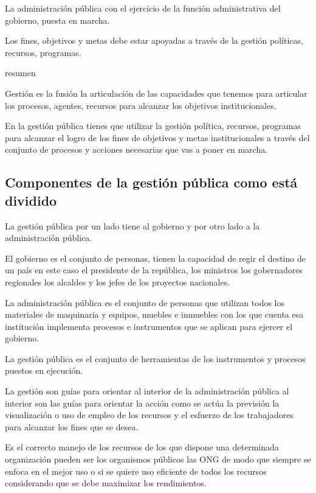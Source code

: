 \documentclass[
  letterpaper,
  DIV=11,
  numbers=noendperiod]{scrartcl}
\begin{document}
La administración pública con el ejercicio de la función administrativa
del gobierno, puesta en marcha.

Los fines, objetivos y metas debe estar apoyadas a través de la gestión
políticas, recursos, programas.

resumen

Gestión es la fusión la articulación de las capacidades que tenemos para
articular los procesos, agentes, recursos para alcanzar los objetivos
institucionales.

En la gestión pública tienes que utilizar la gestión política, recursos,
programas para alcanzar el logro de los fines de objetivos y metas
institucionales a través del conjunto de procesos y acciones necesarias
que vas a poner en marcha.

\hypertarget{componentes-de-la-gestiuxf3n-puxfablica-como-estuxe1-dividido}{%
\subsection{Componentes de la gestión pública como está
dividido}\label{componentes-de-la-gestiuxf3n-puxfablica-como-estuxe1-dividido}}

La gestión pública por un lado tiene al gobierno y por otro lado a la
administración pública.

El gobierno es el conjunto de personas, tienen la capacidad de regir el
destino de un país en este caso el presidente de la república, los
ministros los gobernadores regionales los alcaldes y los jefes de los
proyectos nacionales.

La administración pública es el conjunto de personas que utilizan todos
los materiales de maquinaria y equipos, muebles e inmuebles con los que
cuenta esa institución implementa procesos e instrumentos que se aplican
para ejercer el gobierno.

La gestión pública es el conjunto de herramientas de los instrumentos y
procesos puestos en ejecución.

La gestión son guías para orientar al interior de la administración
pública al interior son las guías para orientar la acción como se actúa
la previsión la visualización o uso de empleo de los recursos y el
esfuerzo de los trabajadores para alcanzar los fines que se desea.

Es el correcto manejo de los recursos de los que dispone una determinada
organización pueden ser los organismos públicos las ONG de modo que
siempre se enfoca en el mejor uso o si se quiere uso eficiente de todos
los recursos considerando que se debe maximizar los rendimientos.
\end{document}
